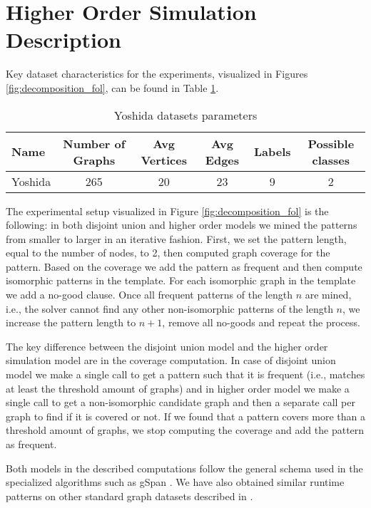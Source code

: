 \newpage
\appendix
\section{Higher Order Simulation Description}
\label{sec:hol_description}
Key dataset characteristics for the experiments, visualized in Figures \ref{fig:decomposition_fol}, can be found in Table \ref{table:yoshida}.
\begin{table}[thb]
  \caption{Yoshida datasets parameters}
  \label{table:yoshida}
  \begin{tabular}{l c c c c c}
    Name & Number of Graphs & Avg Vertices & Avg Edges & Labels & Possible classes\\
    \hline
    Yoshida & 265 & 20 &  23 &  9 & 2
  \end{tabular}
\end{table}

The experimental setup visualized in Figure \ref{fig:decomposition_fol} is the following: in both disjoint union and higher order models we mined the patterns from smaller to larger in an iterative fashion. First, we set the pattern length, equal to the number of nodes, to 2, then computed graph coverage for the pattern. Based on the coverage we add the pattern as frequent and then compute isomorphic patterns in the template. For each isomorphic graph in the template we add a no-good clause. Once all frequent patterns of the length $n$ are mined, i.e., the solver cannot find any other non-isomorphic patterns of the length $n$, we increase the pattern length to $n+1$, remove all no-goods and repeat the process.

The key difference between the disjoint union model and the higher order simulation model are in the coverage computation. In case of disjoint union model we make a single call to get a pattern such that it is frequent (i.e., matches at least the threshold amount of graphs) and in higher order model we make a single call to get a non-isomorphic candidate graph and then a separate call per graph to find if it is covered or not. If we found that a pattern covers more than a threshold amount of graphs, we stop computing the coverage and add the pattern as frequent.

Both models in the described computations follow the general schema used in the specialized algorithms such as gSpan \cite{gspan}. We have also obtained similar runtime patterns on other standard graph datasets described in \cite{ilp_graph_mining}.

